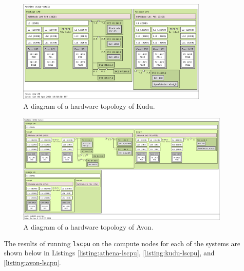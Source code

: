 \begin{figure}[H]
    \centering
    \includegraphics[width=0.85\textwidth]{images/8_appendix/kudu-topology.png}
    \caption{A diagram of a hardware topology of Kudu.}
    \label{fig:kudu-topology}
\end{figure}

\begin{figure}[H]
    \centering
    \includegraphics[width=0.95\textwidth]{images/8_appendix/avon-topology.png}
    \caption{A diagram of a hardware topology of Avon.}
    \label{fig:avon-topology}
\end{figure}

The results of running \texttt{lscpu} on the compute nodes for each of the systems are shown below in Listings \ref{listing:athena-lscpu}, \ref{listing:kudu-lscpu}, and \ref{listing:avon-lscpu}.

